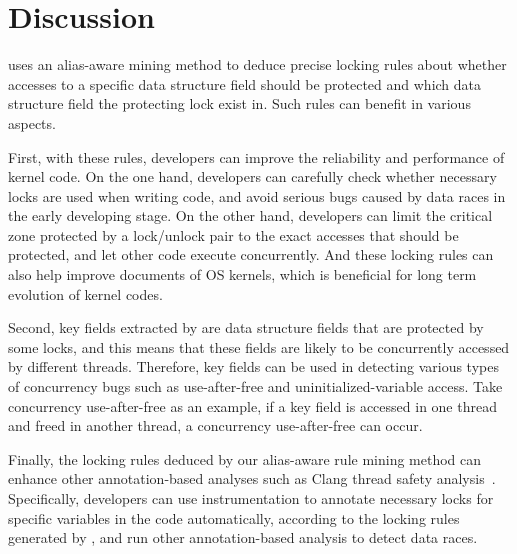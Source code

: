\section{Discussion}
\label{sec_discussion}

 \sys uses an alias-aware mining method to 
deduce precise locking rules about whether accesses to a specific data 
structure field should be protected and which data structure field the 
protecting lock exist in. Such rules can benefit in various aspects. 

First, with these rules, developers can improve the reliability 
and performance of kernel code. On the one hand, developers can carefully check 
whether necessary locks are used when writing code, and avoid serious bugs 
caused by data races in the early developing stage. On the other hand, 
developers can limit the critical zone protected by a lock/unlock pair to the 
exact accesses that should be protected, and let other code execute 
concurrently. And these locking rules can also help improve documents of OS 
kernels, which is beneficial  for long term evolution of kernel codes.

Second, key fields extracted by \sys are data structure fields that are 
protected by some locks, and this means that these fields are likely to be 
concurrently accessed by different threads. Therefore, key fields can be used 
in detecting various types of concurrency bugs such as use-after-free and 
uninitialized-variable access. Take concurrency use-after-free as an example, 
if a key field is accessed in one thread and freed in another thread, a 
concurrency use-after-free can occur.

Finally, the locking rules deduced by our alias-aware rule mining method can 
enhance other annotation-based analyses such as Clang thread safety 
analysis~\cite{ClangThreadSafety}. Specifically, developers can use 
instrumentation to annotate necessary locks for specific variables in the code 
automatically, according to the locking rules generated by \sys, and run other 
annotation-based analysis to detect data races.




